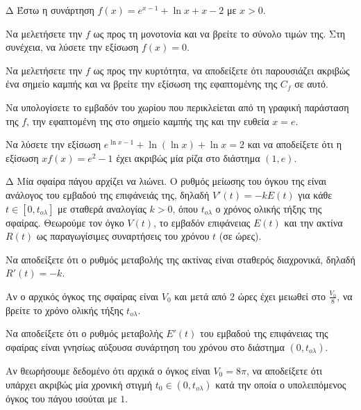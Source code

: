 \begin{thema}{Δ}
Έστω η συνάρτηση $\displaystyle f(x) = e^{x-1} + \ln x + x - 2$ με $x>0$.
\begin{erwthma}
    \item Να μελετήσετε την $f$ ως προς τη μονοτονία και να βρείτε το σύνολο τιμών της. Στη συνέχεια, να λύσετε την εξίσωση $f(x) = 0$.
    \item Να μελετήσετε την $f$ ως προς την κυρτότητα, να αποδείξετε ότι παρουσιάζει ακριβώς ένα σημείο καμπής και να βρείτε την εξίσωση της εφαπτομένης της $C_f$ σε αυτό.
    \item Να υπολογίσετε το εμβαδόν του χωρίου που περικλείεται από τη γραφική παράσταση της $f$, την εφαπτομένη της στο σημείο καμπής της και την ευθεία $x=e$.
    \item Να λύσετε την εξίσωση $e^{\ln x - 1} + \ln(\ln x) + \ln x = 2$ και να αποδείξετε ότι η εξίσωση $x f(x) = e^2 - 1$ έχει ακριβώς μία ρίζα στο διάστημα $(1, e)$.
\end{erwthma}
\end{thema}

\begin{thema}{Δ}
Μία σφαίρα πάγου αρχίζει να λιώνει. Ο ρυθμός μείωσης του όγκου της είναι ανάλογος του εμβαδού της επιφάνειάς της, δηλαδή $V'(t) = -k E(t)$ για κάθε $t \in [0, t_{ολ}]$ με σταθερά αναλογίας $k > 0$, όπου $t_{ολ}$ ο χρόνος ολικής τήξης της σφαίρας. Θεωρούμε τον όγκο $V(t)$, το εμβαδόν επιφάνειας $E(t)$ και την ακτίνα $R(t)$ ως παραγωγίσιμες συναρτήσεις του χρόνου $t$ (σε ώρες).
\begin{erwthma}
    \item Να αποδείξετε ότι ο ρυθμός μεταβολής της ακτίνας είναι σταθερός διαχρονικά, δηλαδή $R'(t) = -k$.
    \item Αν ο αρχικός όγκος της σφαίρας είναι $V_0$ και μετά από $2$ ώρες έχει μειωθεί στο $\frac{V_0}{8}$, να βρείτε το χρόνο ολικής τήξης $t_{ολ}$.
    \item Να αποδείξετε ότι ο ρυθμός μεταβολής $E'(t)$ του εμβαδού της επιφάνειας της σφαίρας είναι γνησίως αύξουσα συνάρτηση του χρόνου στο διάστημα $(0, t_{ολ})$.
    \item Αν θεωρήσουμε δεδομένο ότι αρχικά ο όγκος είναι $V_0 = 8\pi$, να αποδείξετε ότι υπάρχει ακριβώς μία χρονική στιγμή $t_0 \in (0, t_{ολ})$ κατά την οποία ο υπολειπόμενος όγκος του πάγου ισούται με $1$.
\end{erwthma}
\end{thema}

